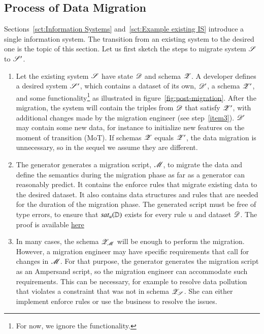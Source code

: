 \documentclass{elsarticle}
\begin{document}
\subsection{Process of Data Migration}
   Sections~\ref{sct:Information Systems} and~\ref{sct:Example existing IS} introduce a single information system.
   The transition from an existing system to the desired one is the topic of this section.
   Let us first sketch the steps to migrate system $\mathscr{S}$ to $\mathscr{S}'$.
\begin{enumerate}
   \item Let the existing system $\mathscr{S}$ have state $\mathscr{D}$ and schema $\mathscr{Z}$.
         A developer defines a desired system $\mathscr{S}'$, which contains a dataset of its own, $\mathscr{D}'$, a schema $\mathscr{Z}'$, and some functionality\footnote{For now, we ignore the functionality.} as illustrated in figure~\ref{fig:post-migration}.
         After the migration, the system will contain the triples from $\mathscr{D}$ that satisfy $\mathscr{Z}'$,
         with additional changes made by the migration engineer (see step~\ref{item3}).
         $\mathscr{D}'$ may contain some new data,
         for instance to initialize new features on the moment of transition (MoT).
         If schemas $\mathscr{Z}$ equals $\mathscr{Z}'$, the data migration is unnecessary, so in the sequel we assume they are different.
   \item The generator generates a migration script, $\mathscr{M}$,
         to migrate the data and define the semantics during the migration phase as far as a generator can reasonably predict.
         It contains the enforce rules that migrate existing data to the desired dataset.
         It also contains data structures and rules that are needed for the duration of the migration phase.
         The generated script must be free of type errors, to ensure that $\text{\it sat\/}_{u}(\mathbb{D})$ exists for every rule $u$ and dataset $\mathscr{D}$.
         The proof is available \href{https://www.isa-afp.org/}{here}
   \item\label{item3}
         In many cases, the schema $\mathscr{Z}_{\mathscr{M}}$ will be enough to perform the migration.
         However, a migration engineer may have specific requirements that call for changes in $\mathscr{M}$.
         For that purpose, the generator generates the migration script as an Ampersand script,
         so the migration engineer can accommodate such requirements.
         This can be necessary, for example to resolve data pollution that violates a constraint that was not in schema $\mathscr{Z}_{\mathscr{S}}$.
         She can either implement enforce rules or use the business to resolve the issues.

\end{enumerate}
\end{document}
